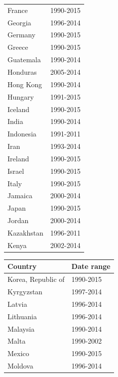 \documentclass[12pt,a4paper]{article}
\begin{document}
\begin{table}[htbp]
\begin{subtable}{0.45\textwidth}
\begin{tabular}{ll}
                    France &  1990-2015 \\
                   Georgia &  1996-2014 \\
                   Germany &  1990-2015 \\
                    Greece &  1990-2015 \\
                 Guatemala &  1990-2014 \\
                  Honduras &  2005-2014 \\
                 Hong Kong &  1990-2014 \\
                   Hungary &  1991-2015 \\
                   Iceland &  1990-2015 \\
                     India &  1990-2014 \\
                 Indonesia &  1991-2011 \\
					  Iran &  1993-2014 \\
                   Ireland &  1990-2015 \\
                    Israel &  1990-2015 \\
                     Italy &  1990-2015 \\
                   Jamaica &  2000-2014 \\
                     Japan &  1990-2015 \\
                    Jordan &  2000-2014 \\
                Kazakhstan &  1996-2011 \\
                     Kenya &  2002-2014 \\
\bottomrule
\end{tabular}
\end{subtable}
\begin{subtable}{0.45\textwidth}
\centering
\begin{tabular}{ll}
\toprule
        Country & Date range \\
\midrule
        Korea, Republic of &  1990-2015 \\
                Kyrgyzstan &  1997-2014 \\
                    Latvia &  1996-2014 \\
                 Lithuania &  1996-2014 \\
                  Malaysia &  1990-2014 \\
                     Malta &  1990-2002 \\
                    Mexico &  1990-2015 \\
                   Moldova &  1996-2014 \\

\end{tabular}
\end{subtable}
\end{table}
\end{document}
